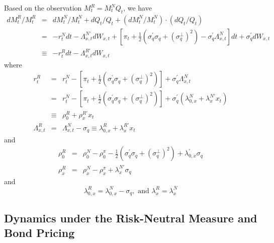 \documentclass{article}
\begin{document}
Based on the observation $M_{t}^{R}=M_{t}^{N}Q_{t}$, we have%
\begin{eqnarray*}
dM_{t}^{R}/M_{t}^{R} &=&dM_{t}^{N}/M_{t}^{N}+dQ_{t}/Q_{t}+\left(
dM_{t}^{N}/M_{t}^{N}\right) \cdot \left( dQ_{t}/Q_{t}\right) \\
&=&-r_{t}^{N}dt-\Lambda _{x,t}^{N\prime }dW_{x,t}+\left[ \pi _{t}+\frac{1}{2}%
\left( \sigma _{q}^{\prime }\sigma _{q}+\left( \sigma _{q}^{\bot }\right)
^{2}\right) -\sigma _{q}^{\prime }\Lambda _{x,t}^{N}\right] dt+\sigma
_{q}^{\prime }dW_{x,t} \\
&\equiv &-r_{t}^{R}dt-\Lambda _{x,t}^{R\prime }dW_{x,t}
\end{eqnarray*}%
where 
\begin{eqnarray*}
r_{t}^{R} &=&r_{t}^{N}-\left[ \pi _{t}+\frac{1}{2}\left( \sigma _{q}^{\prime
}\sigma _{q}+\left( \sigma _{q}^{\bot }\right) ^{2}\right) \right] +\sigma
_{q}^{\prime }\Lambda _{x,t}^{N} \\
&=&r_{t}^{N}-\left[ \pi _{t}+\frac{1}{2}\left( \sigma _{q}^{\prime }\sigma
_{q}+\left( \sigma _{q}^{\bot }\right) ^{2}\right) \right] +\sigma
_{q}^{\prime }\left( \lambda _{0,x}^{N}+\lambda _{x}^{N\prime }x_{t}\right)
\\
&\equiv &\rho _{0}^{R}+\rho _{x}^{R\prime }x_{t} \\
\Lambda _{x,t}^{R} &=&\Lambda _{x,t}^{N}-\sigma _{q}\equiv \lambda
_{0,x}^{R}+\lambda _{x}^{R\prime }x_{t}
\end{eqnarray*}%
and%
\begin{eqnarray*}
\rho _{0}^{R} &=&\rho _{0}^{N}-\rho _{0}^{\pi }-\frac{1}{2}\left( \sigma
_{q}^{\prime }\sigma _{q}+\left( \sigma _{q}^{\bot }\right) ^{2}\right)
+\lambda _{0,x}^{\prime }\sigma _{q} \\
\rho _{x}^{R} &=&\rho _{x}^{N}-\rho _{x}^{\pi }+\lambda _{x}^{N\prime
}\sigma _{q}
\end{eqnarray*}%
and 
\begin{equation*}
\lambda _{0,x}^{R}=\lambda _{0,x}^{N}-\sigma _{q},\text{ and }\lambda
_{x}^{R}=\lambda _{x}^{N}
\end{equation*}

\subsection{Dynamics under the Risk-Neutral Measure and Bond Pricing}
\end{document}
